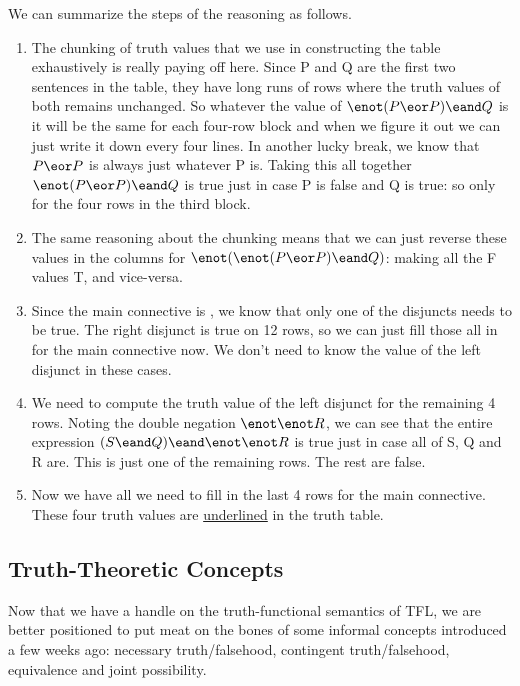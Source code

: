 We can summarize the steps of the reasoning as follows.

\begin{enumerate}
\item The chunking of truth values that we use in constructing the table
  exhaustively is really paying off here. Since P and Q are the first two
  sentences in the table, they have long runs of rows where the truth values of
  both remains unchanged. So whatever the value of $\enot(P \eor P) \eand Q$ is
  it will be the same for each four-row block and when we figure it out we can
  just write it down every four lines. In another lucky break, we know that
  $P \eor P$ is always just whatever P is. Taking this all together
  $\enot(P \eor P) \eand Q$ is true just in case P is false and Q is true: so
  only for the four rows in the third block.
\item The same reasoning about the chunking means that we can just reverse
  these values in the columns for $\enot(\enot(P \eor P) \eand Q)$: making all
  the F values T, and vice-versa.
\item Since the main connective is \eor, we know that only one of the disjuncts
  needs to be true. The right disjunct is true on 12 rows, so we can just fill
  those all in for the main connective now. We don't need to know the value of
  the left disjunct in these cases.
\item We need to compute the truth value of the left disjunct for the remaining
  4 rows. Noting the double negation $\enot\enot R$, we can see that the entire
  expression $(S \eand Q)\eand\enot\enot R$ is true just in case all of S, Q and
  R are. This is just one of the remaining rows. The rest are false.
\item Now we have all we need to fill in the last 4 rows for the main
  connective. These four truth values are \underline{underlined} in the truth
  table.
\end{enumerate}


\subsection{Truth-Theoretic Concepts}

Now that we have a handle on the truth-functional semantics of TFL, we are
better positioned to put meat on the bones of some informal concepts introduced
a few weeks ago: necessary truth/falsehood, contingent truth/falsehood,
equivalence and joint possibility.

